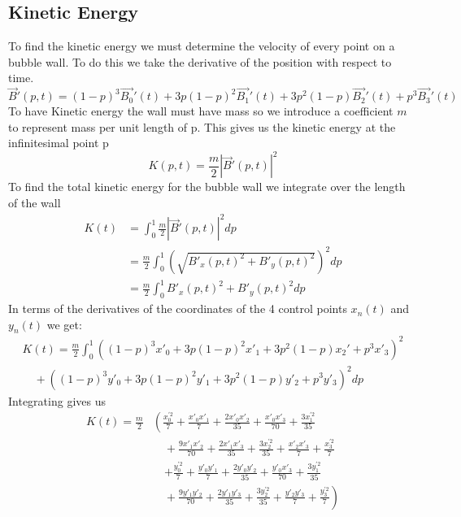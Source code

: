 \documentclass{article}
\begin{document}
\subsection{Kinetic Energy}
To find the kinetic energy we must determine the velocity of every point on a
bubble wall. To do this we take the derivative of the position with respect to
time.
\begin{displaymath}
\vec{B}'(p,t)=(1-p)^3\vec{B_0}'(t)+3p(1-p)^2\vec{B_1}'(t)+3p^2(1-p)\vec{B_2}'(t)+p^3\vec{B_3}'(t)
\end{displaymath}
To have Kinetic energy the wall must have mass so we introduce a coefficient
$m$ to represent mass per unit length of p. This gives us the kinetic energy at the
infinitesimal point p
\begin{displaymath}
K(p,t) = \frac{m}{2} \left|\vec{B}'(p,t)\right|^2
\end{displaymath}
To find the total kinetic energy for the bubble wall we integrate over the
length of the wall
\begin{align*}
K(t)&= \int_0^1 \frac{m}{2} \left|\vec{B}'(p,t)\right|^2 dp\\
&=\frac{m}{2} \int_0^1 \left(\sqrt{B'_x(p,t)^2+B'_y(p,t)^2}\right)^2 dp\\
&=\frac{m}{2} \int_0^1 B'_x(p,t)^2+B'_y(p,t)^2 dp
\end{align*}
In terms of the derivatives of the coordinates of the 4 control points $x_n(t)$
and $y_n(t)$ we get:
\begin{align*}
K(t)=\frac{m}{2} \int_0^1
\left((1-p)^3x'_0+3p(1-p)^2x'_1+3p^2(1-p)x_2'+p^3x'_3\right)^2 \\
 \quad+ \left((1-p)^3y'_0+3p(1-p)^2y'_1+3p^2(1-p)y'_2+p^3y'_3
\right)^2 dp
\end{align*}
Integrating gives us
\begin{align*}
K(t)=\frac{m}{2} &\left( 
\frac{x_0^{'2}}{7} + \frac{x'_0 x'_1}{7} + \frac{2 x'_0 x'_2}{35} + 
\frac{x'_0 x'_3}{70}  + \frac{3 x_1^{'2}}{35} \right.\\
&\left.\quad +\frac{9 x'_1 x'_2}{70} 
+ \frac{2 x'_1 x'_3}{35} + \frac{3 x_2^{'2}}{35} + \frac{x'_2 x'_3}{7} +\frac{x_3^{'2}}{7}\right.\\
&\quad\left. +\frac{y_0^{'2}}{7} + \frac{y'_0 y'_1}{7} + \frac{2 y'_0 y'_2}{35} + 
\frac{y'_0 x'_3}{70} + \frac{3 y_1^{'2}}{35} \right.\\
&\left.\quad  +\frac{9 y'_1 y'_2}{70} 
+ \frac{2 y'_1 y'_3}{35} + \frac{3 y_2^{'2}}{35} + \frac{y'_2 y'_3}{7}
+\frac{y_3^{'2}}{7}\right)
\end{align*}
\end{document}
